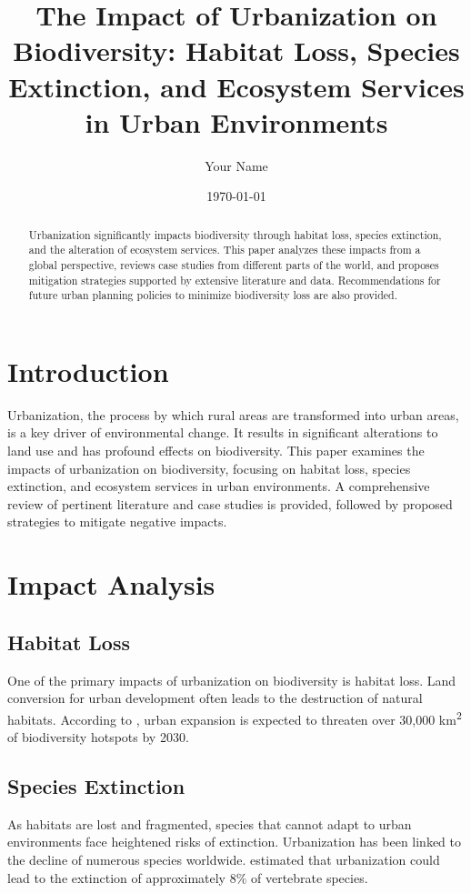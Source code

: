\documentclass[12pt]{article}
\title{The Impact of Urbanization on Biodiversity: Habitat Loss, Species Extinction, and Ecosystem Services in Urban Environments}
\author{Your Name}
\date{\today}
\begin{document}
\maketitle

\begin{abstract}
Urbanization significantly impacts biodiversity through habitat loss, species extinction, and the alteration of ecosystem services. This paper analyzes these impacts from a global perspective, reviews case studies from different parts of the world, and proposes mitigation strategies supported by extensive literature and data. Recommendations for future urban planning policies to minimize biodiversity loss are also provided.
\end{abstract}

\section{Introduction}
Urbanization, the process by which rural areas are transformed into urban areas, is a key driver of environmental change. It results in significant alterations to land use and has profound effects on biodiversity. This paper examines the impacts of urbanization on biodiversity, focusing on habitat loss, species extinction, and ecosystem services in urban environments. A comprehensive review of pertinent literature and case studies is provided, followed by proposed strategies to mitigate negative impacts.

\section{Impact Analysis}

\subsection{Habitat Loss}
One of the primary impacts of urbanization on biodiversity is habitat loss. Land conversion for urban development often leads to the destruction of natural habitats. According to \citet{seto2012}, urban expansion is expected to threaten over 30,000 km\textsuperscript{2} of biodiversity hotspots by 2030.

\subsection{Species Extinction}
As habitats are lost and fragmented, species that cannot adapt to urban environments face heightened risks of extinction. Urbanization has been linked to the decline of numerous species worldwide. \citet{mcdonald2008} estimated that urbanization could lead to the extinction of approximately 8\% of vertebrate species.
\end{document}
